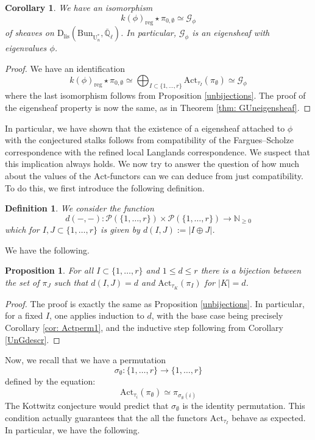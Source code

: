 \documentclass[reqno,11pt]{amsart}
\newtheorem{proposition}[theorem]{Proposition}
\newtheorem{corollary}[theorem]{Corollary}
\newtheorem{definition}[theorem]{Definition}
\theoremstyle{remark}
\newcommand{\U}{\mathrm{U}}
\newcommand{\mc}{\mathcal}
\newcommand{\Act}{\mathrm{Act}}
\newcommand{\Bun}{\mathrm{Bun}}
\newcommand{\Dlis}{\mathrm{D}_{\mathrm{lis}}}
\def\ol{\overline}
\def\ra{\rightarrow}
\begin{document}
\begin{corollary}{\label{Cor: Uneigsheaf}}
We have an isomorphism 
\[ k(\phi)_{\mathrm{reg}}\star \pi_{0,\emptyset} \simeq \mathcal{G}_{\phi} \]
of sheaves on $\Dlis(\Bun_{\U^*_n},\ol{\mathbb{Q}}_{\ell})$. In particular, $\mathcal{G}_{\phi}$ is an eigensheaf with eigenvalues $\phi$.
\end{corollary}
\begin{proof}
We have an identification
\[ k(\phi)_{\mathrm{reg}}\star \pi_{0,\emptyset} \simeq \bigoplus_{I \subset \{1,\ldots,r\}} \Act_{\tau_{I}}(\pi_{\emptyset}) \simeq \mathcal{G}_{\phi} \]
where the last isomorphism follows from Proposition \ref{unbijections}. The proof of the eigensheaf property is now the same, as in Theorem \ref{thm: GUneigensheaf}.
\end{proof}
In particular, we have shown that the existence of a eigensheaf attached to $\phi$ with the conjectured stalks follows from compatibility of the Fargues--Scholze correspondence with the refined local Langlands correspondence. We suspect that this implication always holds. We now try to answer the question of how much about the values of the $\Act$-functors can we can deduce from just compatibility. To do this, we first introduce the following definition.
\begin{definition}
We consider the function 
\[ d(-,-): \mc{P}(\{1,\ldots,r\}) \times \mc{P}(\{1,\ldots, r\}) \ra \mathbb{N}_{\geq 0} \]
which for $I,J \subset \{1,\ldots,r\}$ is given by $d(I,J) := |I \oplus J|$. 
\end{definition}
We have the following. 
\begin{proposition}{\label{prop: actbij}}
For all $I \subset \{1,\ldots,r\}$ and $1 \leq d \leq r$ there is a bijection between the set of $\pi_{J}$ such that $d(I,J) = d$ and $\Act_{\tau_{K}}(\pi_{I})$ for $|K| = d$. 
\end{proposition}
\begin{proof}
The proof is exactly the same as Proposition \ref{unbijections}. In particular, for a fixed $I$, one applies induction to $d$, with the base case being precisely Corollary \ref{cor: Actperm1}, and the inductive step following from Corollary \ref{UnGdescr}.
\end{proof}
Now, we recall that we have a permutation 
\[ \sigma_{\emptyset}: \{1,\ldots,r\} \ra \{1,\ldots,r\} \]
defined by the equation:
\[ \Act_{\tau_{i}}(\pi_{\emptyset}) \simeq \pi_{\sigma_{\emptyset}(i)} \]
The Kottwitz conjecture would predict that $\sigma_{\emptyset}$ is the identity permutation. This condition actually guarantees that the all the functors $\Act_{\tau_{I}}$ behave as expected. In particular, we have the following.
\end{document}
